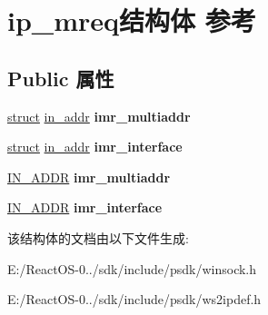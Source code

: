 \hypertarget{structip__mreq}{}\section{ip\+\_\+mreq结构体 参考}
\label{structip__mreq}
\subsection*{Public 属性}
\begin{DoxyCompactItemize}
\item 
\mbox{\label{structip__mreq_a68a7523377d80bddb61cd260ed0d8658}} 
\hyperlink{interfacestruct}{struct} \hyperlink{structin__addr}{in\+\_\+addr} {\bfseries imr\+\_\+multiaddr}
\item 
\mbox{\label{structip__mreq_a5a01c67398a3c25dab84996a04730a2a}} 
\hyperlink{interfacestruct}{struct} \hyperlink{structin__addr}{in\+\_\+addr} {\bfseries imr\+\_\+interface}
\item 
\mbox{\label{structip__mreq_ab1e92d0eea1e602c69e1700074b7a34f}} 
\hyperlink{structin__addr}{I\+N\+\_\+\+A\+D\+DR} {\bfseries imr\+\_\+multiaddr}
\item 
\mbox{\label{structip__mreq_ac32eb18d75dd937d11e5d449a4b26e3c}} 
\hyperlink{structin__addr}{I\+N\+\_\+\+A\+D\+DR} {\bfseries imr\+\_\+interface}
\end{DoxyCompactItemize}


该结构体的文档由以下文件生成\+:\begin{DoxyCompactItemize}
\item 
E\+:/\+React\+O\+S-\/0../sdk/include/psdk/winsock.\+h\item 
E\+:/\+React\+O\+S-\/0../sdk/include/psdk/ws2ipdef.\+h\end{DoxyCompactItemize}
